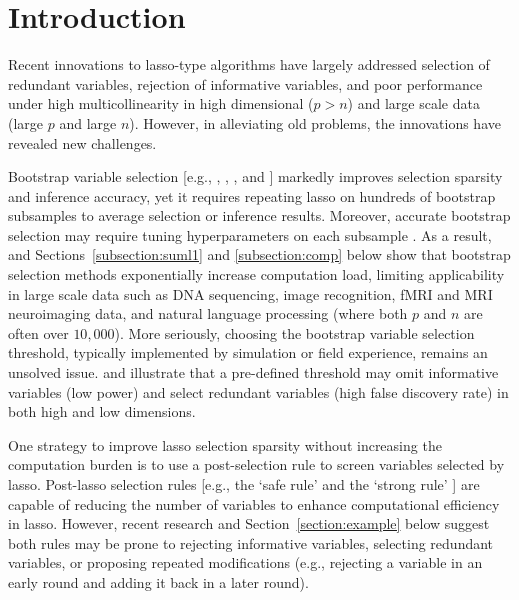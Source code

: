\documentclass[11pt,review,authoryear]{elsarticle}
\begin{document}
\maketitle




\section{Introduction}

Recent innovations to lasso-type algorithms \citep{efronall04, friedman2007pathwise, friedman2010regularization} have largely addressed selection of redundant variables, rejection of informative variables, and poor performance under high multicollinearity in high dimensional ($p>n$) and large scale data (large $p$ and large $n$). However, in alleviating old problems, the innovations have revealed new challenges.

Bootstrap variable selection [e.g., \citet{bach2008bolasso}, \citet{meinshausen2010stability}, \citet{wang2011random}, and \citet{mameli2017estimating}] markedly improves selection sparsity and inference accuracy, yet it requires repeating lasso on hundreds of bootstrap subsamples to average selection or inference results. Moreover, accurate bootstrap selection may require tuning hyperparameters on each subsample \citep{meinshausen2010stability}. As a result, \citet{xu2012asymptotic} and Sections~\ref{subsection:suml1} and \ref{subsection:comp} below show that bootstrap selection methods exponentially increase computation load, limiting applicability in large scale data such as DNA sequencing, image recognition, fMRI and MRI neuroimaging data, and natural language processing (where both $p$ and $n$ are often over $10,000$). More seriously, choosing the bootstrap variable selection threshold, typically implemented by simulation or field experience, remains an unsolved issue. \citet{bach2008bolasso} and \citet[Figure~2]{huang2014stat} illustrate that a pre-defined threshold may omit informative variables (low power) and select redundant variables (high false discovery rate) in both high and low dimensions.

One strategy to improve lasso selection sparsity without increasing the computation burden is to use a post-selection rule to screen variables selected by lasso. Post-lasso selection rules [e.g., the `safe rule' \citep{ghaoui2010safe} and the `strong rule' \citep{tibshirani2012strong}] are capable of reducing the number of variables to enhance computational efficiency in lasso. However, recent research \citep{wang2014safe, zeng2017efficient} and Section~\ref{section:example} below suggest both rules may be prone to rejecting informative variables, selecting redundant variables, or proposing repeated modifications (e.g., rejecting a variable in an early round and adding it back in a later round).
\end{document}
